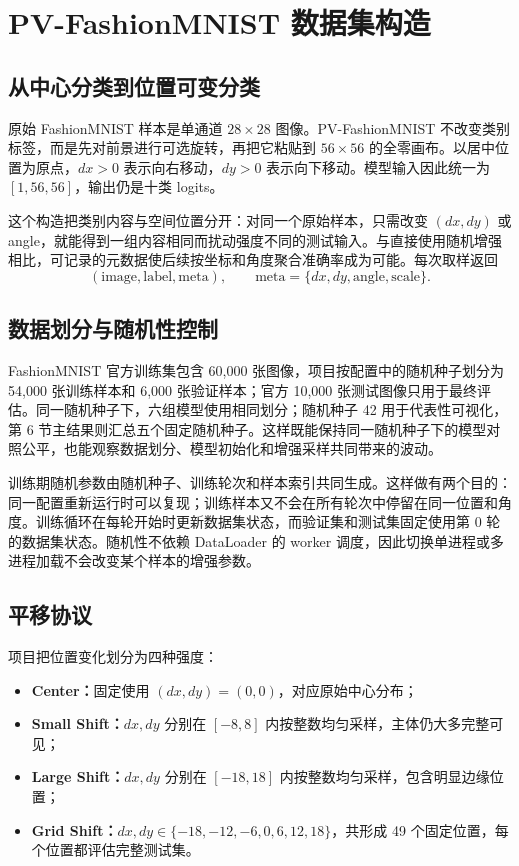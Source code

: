 \section{PV-FashionMNIST 数据集构造}

\subsection{从中心分类到位置可变分类}

原始 FashionMNIST 样本是单通道 $28\times28$ 图像。PV-FashionMNIST 不改变类别标签，而是先对前景进行可选旋转，再把它粘贴到 $56\times56$ 的全零画布。以居中位置为原点，$dx>0$ 表示向右移动，$dy>0$ 表示向下移动。模型输入因此统一为 $[1,56,56]$，输出仍是十类 logits。

这个构造把类别内容与空间位置分开：对同一个原始样本，只需改变 $(dx,dy)$ 或 angle，就能得到一组内容相同而扰动强度不同的测试输入。与直接使用随机增强相比，可记录的元数据使后续按坐标和角度聚合准确率成为可能。每次取样返回
\[
  (\text{image},\text{label},\text{meta}),\qquad
  \text{meta}=\{dx,dy,\text{angle},\text{scale}\}.
\]

\subsection{数据划分与随机性控制}

FashionMNIST 官方训练集包含 60,000 张图像，项目按配置中的随机种子划分为 54,000 张训练样本和 6,000 张验证样本；官方 10,000 张测试图像只用于最终评估。同一随机种子下，六组模型使用相同划分；随机种子 42 用于代表性可视化，第 6 节主结果则汇总五个固定随机种子。这样既能保持同一随机种子下的模型对照公平，也能观察数据划分、模型初始化和增强采样共同带来的波动。

训练期随机参数由随机种子、训练轮次和样本索引共同生成。这样做有两个目的：同一配置重新运行时可以复现；训练样本又不会在所有轮次中停留在同一位置和角度。训练循环在每轮开始时更新数据集状态，而验证集和测试集固定使用第 0 轮的数据集状态。随机性不依赖 DataLoader 的 worker 调度，因此切换单进程或多进程加载不会改变某个样本的增强参数。

\subsection{平移协议}

项目把位置变化划分为四种强度：

\begin{itemize}
  \item \textbf{Center：}固定使用 $(dx,dy)=(0,0)$，对应原始中心分布；
  \item \textbf{Small Shift：}$dx,dy$ 分别在 $[-8,8]$ 内按整数均匀采样，主体仍大多完整可见；
  \item \textbf{Large Shift：}$dx,dy$ 分别在 $[-18,18]$ 内按整数均匀采样，包含明显边缘位置；
  \item \textbf{Grid Shift：}$dx,dy\in\{-18,-12,-6,0,6,12,18\}$，共形成 49 个固定位置，每个位置都评估完整测试集。
\end{itemize}

